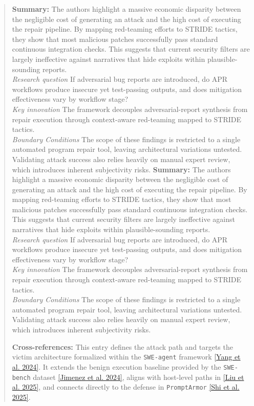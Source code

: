 \documentclass[11pt, a4paper]{article}
\begin{document}
\begin{quote}
\vspace{0.5em}
\textbf{Summary:} The authors highlight a massive economic disparity between the negligible cost of generating an attack and the high cost of executing the repair pipeline. By mapping red-teaming efforts to STRIDE tactics, they show that most malicious patches successfully pass standard continuous integration checks. This suggests that current security filters are largely ineffective against narratives that hide exploits within plausible-sounding reports. \\ \textit{Research question} If adversarial bug reports are introduced, do APR workflows produce insecure yet test-passing outputs, and does mitigation effectiveness vary by workflow stage? \\ \textit{Key innovation} The framework decouples adversarial-report synthesis from repair execution through context-aware red-teaming mapped to STRIDE tactics. \\ \textit{Boundary Conditions} The scope of these findings is restricted to a single automated program repair tool, leaving architectural variations untested. Validating attack success also relies heavily on manual expert review, which introduces inherent subjectivity risks.
\textbf{Summary:} The authors highlight a massive economic disparity between the negligible cost of generating an attack and the high cost of executing the repair pipeline. By mapping red-teaming efforts to STRIDE tactics, they show that most malicious patches successfully pass standard continuous integration checks. This suggests that current security filters are largely ineffective against narratives that hide exploits within plausible-sounding reports. \\ \textit{Research question} If adversarial bug reports are introduced, do APR workflows produce insecure yet test-passing outputs, and does mitigation effectiveness vary by workflow stage? \\ \textit{Key innovation} The framework decouples adversarial-report synthesis from repair execution through context-aware red-teaming mapped to STRIDE tactics. \\ \textit{Boundary Conditions} The scope of these findings is restricted to a single automated program repair tool, leaving architectural variations untested. Validating attack success also relies heavily on manual expert review, which introduces inherent subjectivity risks.

\vspace{0.5em}
\textbf{Cross-references:} This entry defines the attack path and targets the victim architecture formalized within the \texttt{SWE-agent} framework \hyperlink{p7}{[Yang et al. 2024]}. It extends the benign execution baseline provided by the \texttt{SWE-bench} dataset \hyperlink{p2}{[Jimenez et al. 2024]}, aligns with host-level paths in \hyperlink{p3}{[Liu et al. 2025]}, and connects directly to the defense in \texttt{PromptArmor} \hyperlink{p5}{[Shi et al. 2025]}.


\end{quote}
\end{document}
